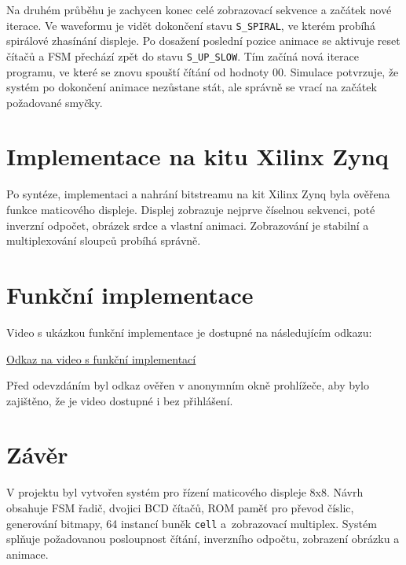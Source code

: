 \documentclass[11pt,a4paper]{article}
\begin{document}
Na druhém průběhu je zachycen konec celé zobrazovací sekvence a začátek nové iterace. 
Ve waveformu je vidět dokončení stavu \texttt{S\_SPIRAL}, ve kterém probíhá spirálové 
zhasínání displeje. Po dosažení poslední pozice animace se aktivuje reset čítačů a FSM 
přechází zpět do stavu \texttt{S\_UP\_SLOW}. Tím začíná nová iterace programu, ve které 
se znovu spouští čítání od hodnoty 00. Simulace potvrzuje, že systém po dokončení 
animace nezůstane stát, ale správně se vrací na začátek požadované smyčky.

\section{Implementace na kitu Xilinx Zynq }

Po syntéze, implementaci a nahrání bitstreamu na kit Xilinx Zynq byla ověřena funkce maticového displeje. Displej zobrazuje nejprve číselnou sekvenci, poté inverzní odpočet, obrázek srdce a vlastní animaci. Zobrazování je stabilní a multiplexování sloupců probíhá správně.

\section{Funkční implementace}

Video s ukázkou funkční implementace je dostupné na následujícím odkazu:

\begin{center}
    \href{https://drive.google.com/file/d/17tBV3SdgTNu4UnVacjBxkQPx3mVv7dnv/view?usp=drive_link}{\underline{Odkaz na video s funkční implementací}}
\end{center}

Před odevzdáním byl odkaz ověřen v anonymním okně prohlížeče, aby bylo zajištěno, že je video dostupné i bez přihlášení.

\section{Závěr}

V projektu byl vytvořen systém pro řízení maticového displeje 8x8. Návrh obsahuje FSM řadič, dvojici BCD čítačů, ROM paměť pro převod číslic, generování bitmapy, 64 instancí buněk \texttt{cell} a~zobrazovací multiplex. Systém splňuje požadovanou posloupnost čítání, inverzního odpočtu, zobrazení obrázku a animace.
\end{document}
